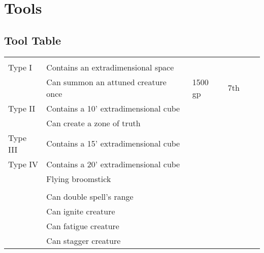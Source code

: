 \section{Tools}

    \onecolumn
    \subsection{Tool Table}

        \begin{longtabuwrapper}
            \begin{longtabu}{l X l l l l}
                 &  &  &  &  \\
                 Type I & Contains an extradimensional space &  &  \\
                 & Can summon an attuned creature once & 1500 gp & 7th &  \\
                 Type II & Contains a 10' extradimensional cube &  &  \\
                 & Can create a zone of truth &  &  \\
                 Type III & Contains a 15' extradimensional cube &  &  \\
                 Type IV & Contains a 20' extradimensional cube &  &  \\
                 & Flying broomstick &  &  \\

                 &  &  &  &  \\
                 & Can double spell's range &  &  \\
                 & Can ignite creature &  &  \\
                 & Can fatigue creature &  &  \\
                 & Can stagger creature &  &  \\
            \end{longtabu}
        \end{longtabuwrapper}
        \twocolumn

